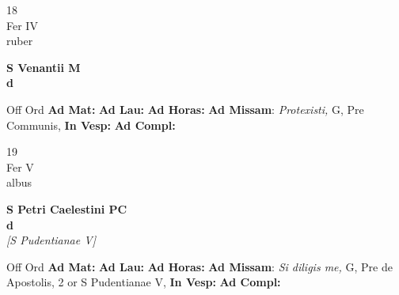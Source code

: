 \documentclass[10pt, openany]{book}
\begin{document}
        \begin{center}
            \begin{minipage}{3.5in}
                \vspace{2em}
                \begin{minipage}{0.5in}
                    {\Huge 18} \\
                    {\normalsize Fer IV} \\
                    {\normalsize ruber}
                \end{minipage}
                \begin{minipage}{3.0in}
                    \textbf{ \large S Venantii M \\
                    \textnormal{\normalsize d}} \\ 
                \end{minipage}
                \begin{justify}Off Ord
                    \textbf{Ad Mat: }
                    \textbf{Ad Lau: }
                    \textbf{Ad Horas: }\textbf{Ad Missam}: \textit{Protexisti,} G, Pre Communis,  
                    \textbf{In Vesp: }
                    \textbf{Ad Compl: }
                \end{justify}
            \end{minipage}
        \end{center}
    
        \begin{center}
            \begin{minipage}{3.5in}
                \vspace{2em}
                \begin{minipage}{0.5in}
                    {\Huge 19} \\
                    {\normalsize Fer V} \\
                    {\normalsize albus}
                \end{minipage}
                \begin{minipage}{3.0in}
                    \textbf{ \large S Petri Caelestini PC \\
                    \textnormal{\normalsize d}} \\ \textit{[S Pudentianae V]} \\ 
                \end{minipage}
                \begin{justify}Off Ord
                    \textbf{Ad Mat: }
                    \textbf{Ad Lau: }
                    \textbf{Ad Horas: }\textbf{Ad Missam}: \textit{Si diligis me,} G, Pre de Apostolis, 2 or S Pudentianae V,  
                    \textbf{In Vesp: }
                    \textbf{Ad Compl: }
                \end{justify}
            \end{minipage}
        \end{center}
    
\end{document}
